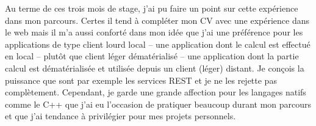 Au terme de ces trois mois de stage, j'ai pu faire un point sur cette expérience
dans mon parcours. Certes il tend à compléter mon CV avec une expérience dans le
web mais il m'a aussi conforté dans mon idée que j'ai une préférence pour les
applications de type client lourd local -- une application dont le calcul est
effectué en local -- plutôt que client léger dématérialisé -- une application
dont la partie calcul est dématérialisée et utilisée depuis un client (léger)
distant.  Je conçois la puissance que sont par exemple les services REST et je
ne les rejette pas complètement. Cependant, je garde une grande affection pour
les langages natifs comme le C++ que j'ai eu l'occasion de pratiquer beaucoup
durant mon parcours et que j'ai tendance à privilégier pour mes projets
personnels.


